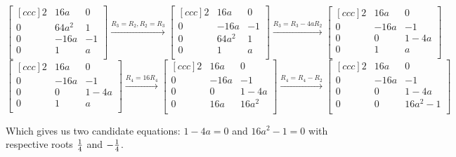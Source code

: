 \documentclass[11pt]{article}
\begin{document}
\begin{equation*}
  \begin{bmatrix}[ccc]
    2 & 16a   & 0 \\
    0 & 64a^2 & 1 \\
    0 & -16a  & -1 \\
    0 & 1     & a \\
  \end{bmatrix}
  \xrightarrow{R_3 = R_2, R_2 = R_3}
  \begin{bmatrix}[ccc]
    2 & 16a   & 0 \\
    0 & -16a  & -1 \\
    0 & 64a^2 & 1 \\
    0 & 1     & a \\
  \end{bmatrix}
  \xrightarrow{R_3 = R_3 - 4aR_2}
  \begin{bmatrix}[ccc]
    2 & 16a  & 0 \\
    0 & -16a & -1 \\
    0 & 0    & 1-4a \\
    0 & 1    & a \\
  \end{bmatrix}
\end{equation*}
\begin{equation*}
  \begin{bmatrix}[ccc]
    2 & 16a  & 0 \\
    0 & -16a & -1 \\
    0 & 0    & 1-4a \\
    0 & 1    & a \\
  \end{bmatrix}
  \xrightarrow{R_4 = 16R_4}
  \begin{bmatrix}[ccc]
    2 & 16a  & 0 \\
    0 & -16a & -1 \\
    0 & 0    & 1-4a \\
    0 & 16a  & 16a^2 \\
  \end{bmatrix}
  \xrightarrow{R_4 = R_4 - R_2}
  \begin{bmatrix}[ccc]
    2 & 16a  & 0 \\
    0 & -16a & -1 \\
    0 & 0    & 1-4a \\
    0 & 0    & 16a^2-1 \\
  \end{bmatrix}
\end{equation*}

Which gives us two candidate equations: $1-4a=0$ and $16a^2-1=0$ with respective roots
${{1}\over{4}}$ and $-{{1}\over{4}}$.
\end{document}
